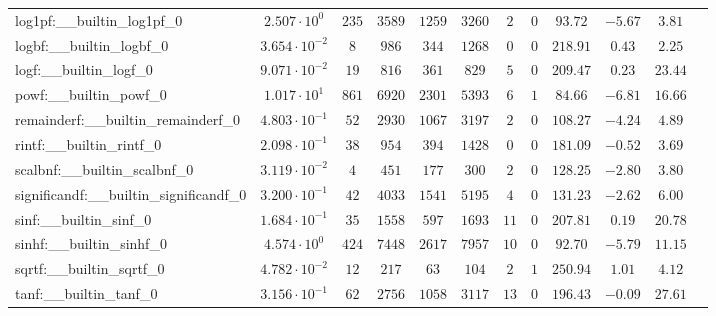 \begin{tabular}{|l|c|c|c|c|c|c|c|c|c|c|c|}
log1pf:\_\_builtin\_log1pf\_0             & $ 2.507 \cdot 10^{0}  $ & $ 235    $ & $ 3589   $ & $ 1259  $ & $ 3260   $ & $ 2   $ & $ 0 $ & $ 93.72       $ & $ -5.67   $ & $ 3.81    $ \\
logbf:\_\_builtin\_logbf\_0               & $ 3.654 \cdot 10^{-2} $ & $ 8      $ & $ 986    $ & $ 344   $ & $ 1268   $ & $ 0   $ & $ 0 $ & $ 218.91      $ & $ 0.43    $ & $ 2.25    $ \\
logf:\_\_builtin\_logf\_0                 & $ 9.071 \cdot 10^{-2} $ & $ 19     $ & $ 816    $ & $ 361   $ & $ 829    $ & $ 5   $ & $ 0 $ & $ 209.47      $ & $ 0.23    $ & $ 23.44   $ \\
powf:\_\_builtin\_powf\_0                 & $ 1.017 \cdot 10^{1}  $ & $ 861    $ & $ 6920   $ & $ 2301  $ & $ 5393   $ & $ 6   $ & $ 1 $ & $ 84.66       $ & $ -6.81   $ & $ 16.66   $ \\
remainderf:\_\_builtin\_remainderf\_0     & $ 4.803 \cdot 10^{-1} $ & $ 52     $ & $ 2930   $ & $ 1067  $ & $ 3197   $ & $ 2   $ & $ 0 $ & $ 108.27      $ & $ -4.24   $ & $ 4.89    $ \\
rintf:\_\_builtin\_rintf\_0               & $ 2.098 \cdot 10^{-1} $ & $ 38     $ & $ 954    $ & $ 394   $ & $ 1428   $ & $ 0   $ & $ 0 $ & $ 181.09      $ & $ -0.52   $ & $ 3.69    $ \\
scalbnf:\_\_builtin\_scalbnf\_0           & $ 3.119 \cdot 10^{-2} $ & $ 4      $ & $ 451    $ & $ 177   $ & $ 300    $ & $ 2   $ & $ 0 $ & $ 128.25      $ & $ -2.80   $ & $ 3.80    $ \\
significandf:\_\_builtin\_significandf\_0 & $ 3.200 \cdot 10^{-1} $ & $ 42     $ & $ 4033   $ & $ 1541  $ & $ 5195   $ & $ 4   $ & $ 0 $ & $ 131.23      $ & $ -2.62   $ & $ 6.00    $ \\
sinf:\_\_builtin\_sinf\_0                 & $ 1.684 \cdot 10^{-1} $ & $ 35     $ & $ 1558   $ & $ 597   $ & $ 1693   $ & $ 11  $ & $ 0 $ & $ 207.81      $ & $ 0.19    $ & $ 20.78   $ \\
sinhf:\_\_builtin\_sinhf\_0               & $ 4.574 \cdot 10^{0}  $ & $ 424    $ & $ 7448   $ & $ 2617  $ & $ 7957   $ & $ 10  $ & $ 0 $ & $ 92.70       $ & $ -5.79   $ & $ 11.15   $ \\
sqrtf:\_\_builtin\_sqrtf\_0               & $ 4.782 \cdot 10^{-2} $ & $ 12     $ & $ 217    $ & $ 63    $ & $ 104    $ & $ 2   $ & $ 1 $ & $ 250.94      $ & $ 1.01    $ & $ 4.12    $ \\
tanf:\_\_builtin\_tanf\_0                 & $ 3.156 \cdot 10^{-1} $ & $ 62     $ & $ 2756   $ & $ 1058  $ & $ 3117   $ & $ 13  $ & $ 0 $ & $ 196.43      $ & $ -0.09   $ & $ 27.61   $ \\

\end{tabular}
